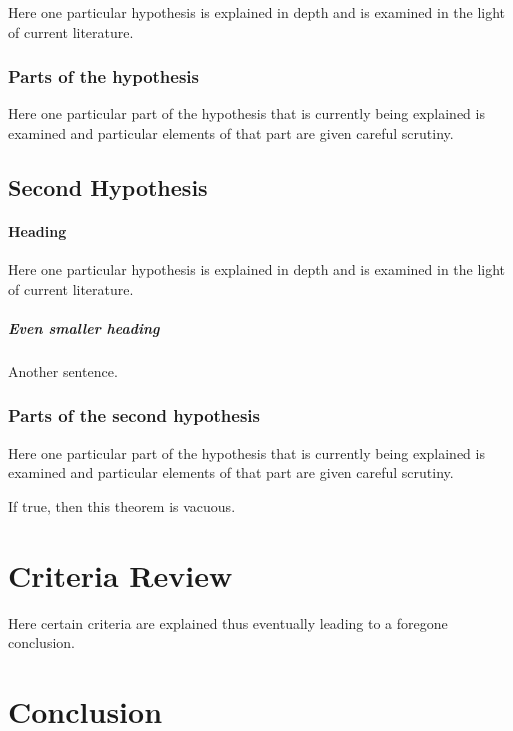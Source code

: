 Here one particular hypothesis is explained in depth
and is examined in the light of current literature.

\subsubsection{Parts of the hypothesis}

Here one particular part of the hypothesis that is
currently being explained is examined and particular
elements of that part are given careful scrutiny.


\subsection{Second Hypothesis}

\paragraph{Heading} Here one particular hypothesis is explained in depth
and is examined in the light of current literature. \subparagraph{Even smaller heading} Another sentence.

\subsubsection{Parts of the second hypothesis}

Here one particular part of the hypothesis that is
currently being explained is examined and particular
elements of that part are given careful scrutiny.
\begin{theorem}
    If true, then this theorem is vacuous.
\end{theorem}

\section{Criteria Review}

Here certain criteria are explained thus eventually
leading to a foregone conclusion.

\section{Conclusion}\label{conclusion}

